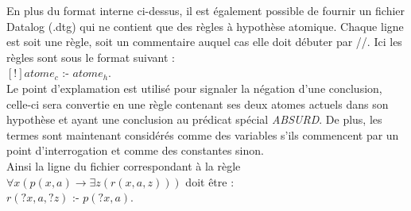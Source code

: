 En plus du format interne ci-dessus, il est également possible de fournir un fichier
Datalog (.dtg) qui ne contient que des règles à hypothèse atomique. Chaque ligne est soit
une règle, soit un commentaire auquel cas elle doit débuter par //.
Ici les règles sont sous le format suivant :\\
$[!]atome_c$ :- $atome_h$.\\
Le point d'explamation est utilisé pour signaler la négation d'une conclusion, celle-ci
sera convertie en une règle contenant ses deux atomes actuels dans son hypothèse et ayant
une conclusion au prédicat spécial {\em ABSURD}.
De plus, les termes sont maintenant considérés comme des variables s'ils commencent par
un point d'interrogation et comme des constantes sinon.\\%
Ainsi la ligne du fichier correspondant à la règle 
$\forall x (p(x,a) \rightarrow \exists z (r(x,a,z)))$ 
doit être :\\
$r(?x,a,?z)$ :- $p(?x,a).$


